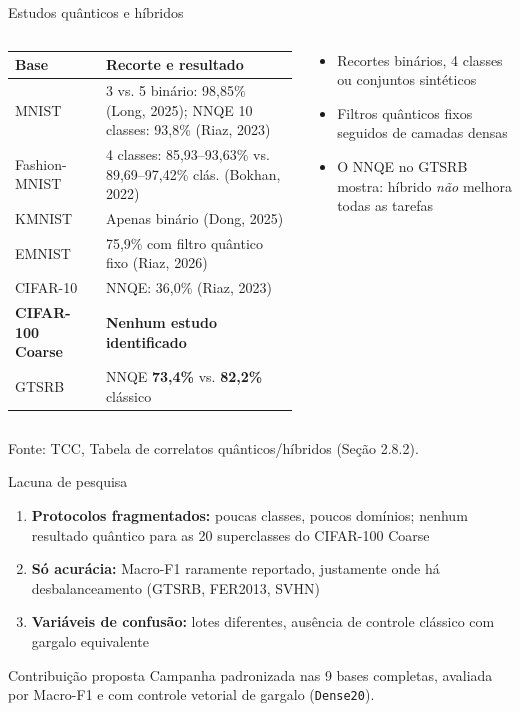 \documentclass[aspectratio=169,11pt,brazil]{beamer}
\newcommand{\fonte}[1]{\par\vfill{\tiny\color{gray}Fonte: #1\par}}
\begin{document}
\begin{frame}{Estudos quânticos e híbridos}
  \begin{columns}[T]
    \begin{column}{0.60\textwidth}
      \scriptsize
      \begin{tabular}{@{}R{2.2cm}R{4.6cm}@{}}
        \toprule
        \textbf{Base} & \textbf{Recorte e resultado} \\
        \midrule
        MNIST & 3 vs. 5 binário: 98,85\% (Long, 2025); NNQE 10 classes: 93,8\% (Riaz, 2023) \\
        Fashion-MNIST & 4 classes: 85,93--93,63\% vs. 89,69--97,42\% clás. (Bokhan, 2022) \\
        KMNIST & Apenas binário (Dong, 2025) \\
        EMNIST & 75,9\% com filtro quântico fixo (Riaz, 2026) \\
        CIFAR-10 & NNQE: 36,0\% (Riaz, 2023) \\
        \textbf{CIFAR-100 Coarse} & \textbf{Nenhum estudo identificado} \\
        GTSRB & NNQE \textbf{73,4\%} vs. \textbf{82,2\%} clássico \\
        \bottomrule
      \end{tabular}
    \end{column}
    \begin{column}{0.37\textwidth}
      \begin{itemize}\small
        \item Recortes binários, 4 classes ou conjuntos sintéticos
        \item Filtros quânticos fixos seguidos de camadas densas
        \item O NNQE no GTSRB mostra: híbrido \textit{não} melhora todas as tarefas
      \end{itemize}
    \end{column}
  \end{columns}
  \fonte{TCC, Tabela de correlatos quânticos/híbridos (Seção 2.8.2).}
\end{frame}

\begin{frame}{Lacuna de pesquisa}
  \begin{enumerate}
    \item \textbf{Protocolos fragmentados:} poucas classes, poucos domínios; nenhum resultado quântico para as 20 superclasses do CIFAR-100 Coarse
    \item \textbf{Só acurácia:} Macro-F1 raramente reportado, justamente onde há desbalanceamento (GTSRB, FER2013, SVHN)
    \item \textbf{Variáveis de confusão:} lotes diferentes, ausência de controle clássico com gargalo equivalente
  \end{enumerate}
  \vspace{0.3cm}
  \begin{block}{Contribuição proposta}
    Campanha padronizada nas 9 bases completas, avaliada por Macro-F1 e com controle vetorial de gargalo (\texttt{Dense20}).
  \end{block}
\end{frame}
\end{document}
